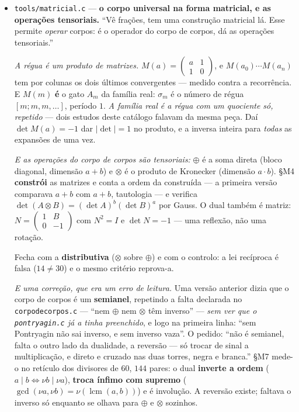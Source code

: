 \documentclass[11pt]{article}
\newcommand{\code}[1]{\texttt{\small #1}}
\theoremstyle{plain}
\theoremstyle{remark}
\begin{document}
\begin{itemize}
\item \code{tools/matricial.c} --- \textbf{o corpo universal na forma matricial, e as operações
tensoriais.} ``Vê frações, tem uma construção matricial lá. Esse permite \emph{operar} corpos: é o
operador do corpo de corpos, dá as operações tensoriais.''

\emph{A régua é um produto de matrizes.} $M(a) = \left(\begin{smallmatrix}a&1\\1&0\end{smallmatrix}\right)$,
e $M(a_0)\cdots M(a_n)$ tem por colunas os dois últimos convergentes --- medido contra a recorrência.
E $M(m)$ \textbf{é} o gato $A_m$ da família real: $\sigma_m$ é o número de régua $[m;m,m,\ldots]$,
período $1$. \emph{A família real é a régua com um quociente só, repetido} --- dois estudos deste
catálogo falavam da mesma peça. Daí $\det M(a) = -1$ dar $|\det| = 1$ no produto, e a inversa
inteira para \emph{todas} as expansões de uma vez.

\emph{E as operações do corpo de corpos são tensoriais:} $\oplus$ é a soma direta (bloco diagonal,
dimensão $a+b$) e $\otimes$ é o produto de Kronecker (dimensão $a\cdot b$). §M4 \textbf{constrói} as
matrizes e conta a ordem da construída --- a primeira versão comparava $a+b$ com $a+b$, tautologia
--- e verifica $\det(A\otimes B) = (\det A)^b(\det B)^a$ por Gauss. O dual também é matriz:
$N = \left(\begin{smallmatrix}1&B\\0&-1\end{smallmatrix}\right)$ com $N^2 = I$ e $\det N = -1$ ---
uma reflexão, não uma rotação.

Fecha com a \textbf{distributiva} ($\otimes$ sobre $\oplus$) e com o controlo: a lei recíproca é
falsa ($14 \neq 30$) e o mesmo critério reprova-a.

\emph{E uma correção, que era um erro de leitura.} Uma versão anterior dizia que o corpo de corpos é um
\textbf{semianel}, repetindo a falta declarada no \code{corpodecorpos.c} --- ``nem $\oplus$ nem
$\otimes$ têm inverso'' --- \emph{sem ver que o \code{pontryagin.c} já a tinha preenchido}, e logo
na primeira linha: ``sem Pontryagin não sai inverso, e sem inverso vaza''. O pedido: ``não é
semianel, falta o outro lado da dualidade, a reversão --- só trocar de sinal a multiplicação, e
direto e cruzado nas duas torres, negra e branca.'' §M7 mede-o no retículo dos divisores de $60$,
$144$ pares: o dual \textbf{inverte a ordem} ($a\mid b \iff \nu b \mid \nu a$), \textbf{troca ínfimo
com supremo} ($\gcd(\nu a,\nu b) = \nu(\operatorname{lcm}(a,b))$) e é involução. A reversão existe;
faltava o inverso só enquanto se olhava para $\oplus$ e $\otimes$ sozinhos.


\end{itemize}
\end{document}
